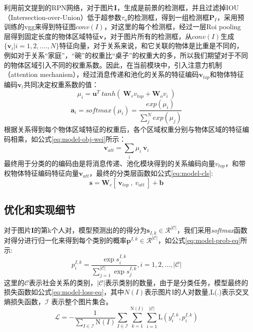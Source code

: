 利用前文提到的RPN网络，对于图片$\bm{I}$，生成是前景的检测框，并且过滤掉IOU（Intersection-over-Union）低于超参数$\tau_{u}$的检测框，得到一组检测框$\bm{P}_{I}$，采用预训练的vgg来得到特征图$conv(I)$，对这里的每个检测框，经过一层Roi pooling 层得到固定长度的物体区域特征$\mathbf{v}$，对于图片所有的检测框，从$conv(I)$生成$\{ \mathbf{v}_{i}|i=1,2,....,N\}$特征向量，对于关系来说，和它关联的物体是比重是不同的，例如对于关系``家庭''，``碗''的权重比``桌子''的权重大的多，所以我们期望对于不同的物体区域引入不同的权重系数。因此，在当前模块中，引入注意力机制
（attention mechanism），经过消息传递和池化的关系的特征编码$\mathbf{v}_{top}$和物体特征编码$\mathbf{v}_{i}$共同决定权重系数的值：
\begin{equation}
    \mu_{i} = \mathbf{u}^{T}~tanh(~\mathbf{W}_{r}v_{top}+\mathbf{W}_{o}v_{i}~)
\end{equation}
\begin{equation}
    \mathbf{a}_{i} = softmax(\mu_i) = \frac{exp(\mu_{i})}{\sum_{j}^{N}exp(\mu_{j})}
\end{equation}
根据关系得到每个物体区域特征的权重后，各个区域权重分别与物体区域的特征编码相乘，如公式\ref{eq:model-obj-wei}所示：
\begin{equation}
    \label{eq:model-obj-wei}
    \mathbf{v}_{att} = \sum_{i}\mu_{i}~\mathbf{v}_i
\end{equation}
最终用于分类的的编码由是将消息传递、池化模块得到的关系编码向量$v_{top}$，和带权物体特征编码特征向量$\mathbf{v}_{att}$，最终的分类层函数如公式\ref{eq:model-cls}:
\begin{equation}
    \label{eq:model-cls}
    \mathbf{s} = \mathbf{W}_{c}[~\mathbf{v}_{top}~,~v_{att}~] + \mathbf{b}
\end{equation}

\subsection{优化和实现细节}

对于图片\textbf{I}的第k个人对，模型预测出的的得分为$\mathbf{s}_{I,k} \in \mathcal{R}^{|\mathcal{C}|}$，我们采用{\it softmax}函数对得分进行归一化来得到每个类别的概率$\mathbf{p}^{I,k} \in \mathcal{R}^{|\mathcal{C}|}$，如公式\ref{eq:model-prob-eq}所示:
\begin{equation}
  \label{eq:model-prob-eq}
  p_i^{I,k} = \frac{\exp{s_i^{I,k}}}{\sum_{j=1}^{|\mathcal{C}|}{\exp{s_j^{I,k}}}}, i=1,2,\dots,|\mathcal{C}|
\end{equation}
这里的$\mathcal{C}$表示社会关系的类别，$|\mathcal{C}|$表示类别的数量，由于是分类任务，模型最终的损失函数如公式\ref{eq:model-loss-eq}，其中$N(I)$表示图片I的人对数量,L(.)表示交叉熵损失函数，$\mathcal{I}$ 表示整个图片集合。
\begin{equation}
  \label{eq:model-loss-eq}
  \mathcal{L} = - \frac{1}{\sum_{I \in \mathcal{I}}\text{N}(I)} \sum_{I \in \mathcal{I}} \sum_{k=1}^{\text{N}(I)} \sum_{i=1}^{|\mathcal{C}|} \text{L}(y_{i}^{I,k}, p_{i}^{I,k})
\end{equation}

